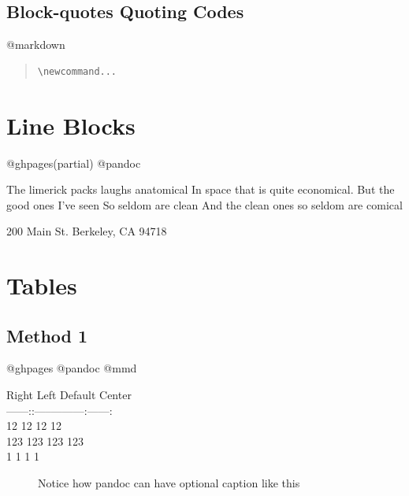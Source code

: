 \subsection{Block-quotes Quoting Codes}
\label{block-quotesquotingcodes}

@markdown

\begin{quote}

\begin{verbatim}
\newcommand...
\end{verbatim}
\end{quote}

\section{Line Blocks}
\label{lineblocks}

@ghpages(partial) @pandoc

\textbar{} The limerick packs laughs anatomical
\textbar{} In space that is quite economical.
\textbar{} But the good ones I've seen
\textbar{} So seldom are clean
\textbar{} And the clean ones so seldom are comical

\textbar{} 200 Main St.
\textbar{} Berkeley, CA 94718

\section{Tables}
\label{tables}

\subsection{Method 1}
\label{method1}

@ghpages @pandoc @mmd

\begin{description}

\item[\textbar{} Right \textbar{} Left \textbar{} Default \textbar{} Center \textbar{}]

\item[\textbar{}------:\textbar{}:-----\textbar{}---------\textbar{}:------:\textbar{}]

\item[\textbar{} 12 \textbar{} 12 \textbar{} 12 \textbar{} 12 \textbar{}]

\item[\textbar{} 123 \textbar{} 123 \textbar{} 123 \textbar{} 123 \textbar{}]

\item[\textbar{} 1 \textbar{} 1 \textbar{} 1 \textbar{} 1 \textbar{}]

Notice how pandoc can have optional caption like this
\end{description}

